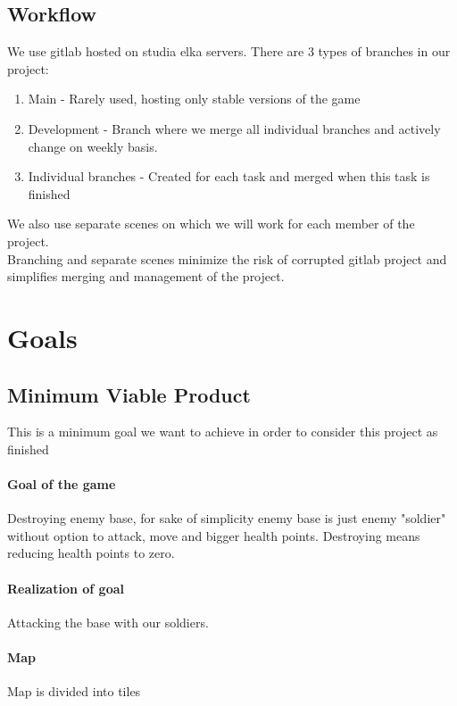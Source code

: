 \documentclass{article}
\begin{document}
\subsection{Workflow}
We use gitlab hosted on studia elka servers. There are 3 types of branches in our project:
\begin{enumerate}
    \item Main - Rarely used, hosting only stable versions of the game 
    \item Development - Branch where we merge all individual branches and actively change on weekly basis.
    \item Individual branches - Created for each task and merged when this task is finished
\end{enumerate}
We also use separate scenes on which we will work for each member of the project. \\
Branching and separate scenes minimize the risk of corrupted gitlab project and simplifies merging and management of the project.

\section{Goals}

\subsection{Minimum Viable Product}
This is a minimum goal we want to achieve in order to consider this project as finished \\ 
\paragraph{Goal of the game} Destroying enemy base, for sake of simplicity enemy base is just enemy "soldier" without option to attack, move and bigger health points. Destroying means reducing health points to zero.
\paragraph{Realization of goal} Attacking the base with our soldiers.

\paragraph{Map}
Map is divided into tiles
\end{document}
